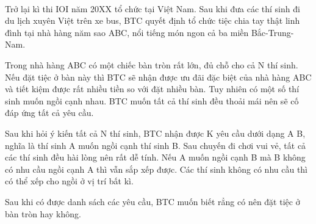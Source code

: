  

Trở lại kì thi IOI năm 20XX tổ chức tại Việt Nam. Sau khi đưa các thí sinh đi du lịch xuyên Việt trên xe bus, BTC quyết định tổ chức tiệc chia tay thật linh đình tại nhà hàng năm sao ABC, nổi tiếng món ngon cả ba miền Bắc-Trung-Nam.

Trong nhà hàng ABC có một chiếc bàn tròn rất lớn, đủ chỗ cho cả N thí sinh. Nếu đặt tiệc ở bàn này thì BTC sẽ nhận được ưu đãi đặc biệt của nhà hàng ABC và tiết kiệm được rất nhiều tiền so với đặt nhiều bàn. Tuy nhiên có một số thí sinh muốn ngồi cạnh nhau. BTC muốn tất cả thí sinh đều thoải mái nên sẽ cố đáp ứng tất cả yêu cầu.

Sau khi hỏi ý kiến tất cả N thí sinh, BTC nhận được K yêu cầu dưới dạng A B, nghĩa là thí sinh A muốn ngồi cạnh thí sinh B. Sau chuyến đi chơi vui vẻ, tất cả các thí sinh đều hài lòng nên rất dễ tính. Nếu A muốn ngồi cạnh B mà B không có nhu cầu ngồi cạnh A thì vẫn sắp xếp được. Các thí sinh không có nhu cầu thì có thể xếp cho ngồi ở vị trí bất kì.

Sau khi có được danh sách các yêu cầu, BTC muốn biết rẳng có nên đặt tiệc ở bàn tròn hay không.

\